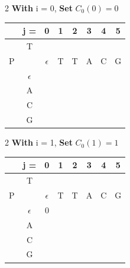 \begin{multicols}{2}
    \textbf{With} i = 0, \textbf{Set} $C_0(0) = 0$

    \begin{center}
        \begin{tabular}{|c c|c|c|c|c|c|c|} \hline
        &   j =  &  0           &   1   &   2   &   3   &   4   &   5   \\ \hline
        &   T    &              &       &       &       &       &       \\
        P   &        &  $\epsilon$  &   T   &   T   &   A   &   C   &   G   \\ \hline
        & $\epsilon$ &   \ccr0      &       &       &       &       &       \\ \hline
        &    A   &              &       &       &       &       &       \\ \hline
        &    C   &              &       &       &       &       &       \\ \hline
        &    G   &              &       &       &       &       &       \\ \hline
        \end{tabular}
    \end{center}
\end{multicols}

\begin{multicols}{2}
    \textbf{With} i = 1, \textbf{Set} $C_0(1) = 1$

    \begin{center}
        \begin{tabular}{|c c|c|c|c|c|c|c|} \hline
        &   j =  &  0           &   1   &   2   &   3   &   4   &   5   \\ \hline
        &   T    &              &       &       &       &       &       \\
        P   &        &  $\epsilon$  &   T   &   T   &   A   &   C   &   G   \\ \hline
        & $\epsilon$ &       0      &       &       &       &       &       \\ \hline
        &    A   & \ccr1        &       &       &       &       &       \\ \hline
        &    C   &              &       &       &       &       &       \\ \hline
        &    G   &              &       &       &       &       &       \\ \hline
        \end{tabular}
    \end{center}
\end{multicols}

